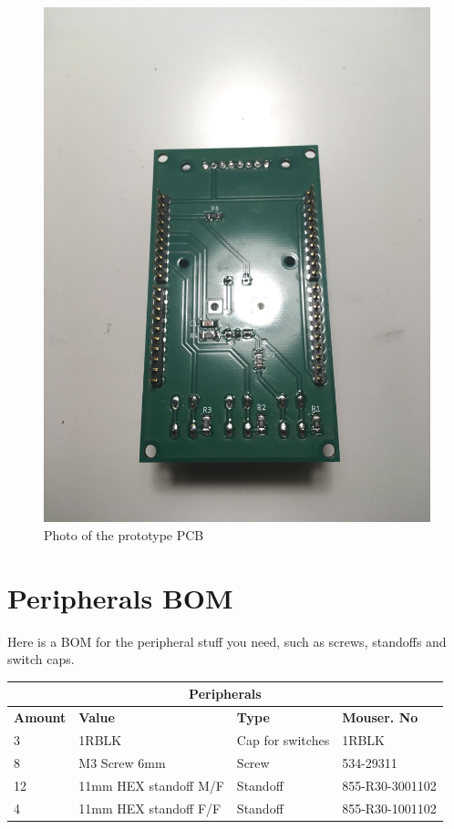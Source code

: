 \documentclass{article}
\begin{document}
  \begin{figure}[H]
  	\centering
  	\includegraphics[width=1\linewidth]{IMG_2391.jpg}
  	\caption{Photo of the prototype PCB}
 	 \label{fig: pcb22t}
\end{figure}
\newpage
\section{Peripherals BOM}
Here is a BOM for the peripheral stuff you need, such as screws, standoffs and switch caps. 

  \begin{center}
    \begin{tabular}{ |m{6em}|m{7em}|m{7em}|m{7em}|}
    \hline
	 \multicolumn{4}{|c|}{\textbf{Peripherals}} \\
	 \hline
       \textbf{Amount} & \textbf{Value} & \textbf{Type} & \textbf{Mouser. No} \\ \hline
	3 & 1RBLK & Cap for switches & 1RBLK \\ \hline
	8 & M3 Screw 6mm & Screw & 534-29311 \\ \hline
	12 & 11mm HEX standoff M/F & Standoff & 855-R30-3001102 \\ \hline
	4 & 11mm HEX standoff F/F & Standoff & 855-R30-1001102 \\ \hline
    \end{tabular}
     \end{center}
\end{document}
